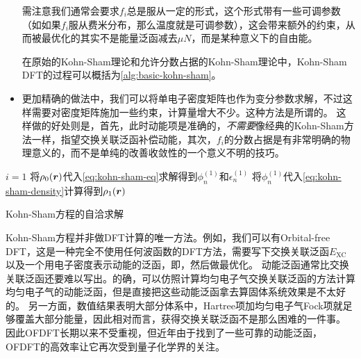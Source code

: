 \begin{itemize}
    需注意我们通常会要求$f_i$总是服从一定的形式，这个形式带有一些可调参数（如如果$f_i$服从费米分布，那么温度就是可调参数），这会带来额外的约束，从而被最优化的其实不是能量泛函减去$\mu N$，而是某种意义下的自由能。

    在原始的Kohn-Sham理论和允许分数占据的Kohn-Sham理论中，Kohn-Sham DFT的过程可以概括为\autoref{alg:basic-kohn-sham}。
    \item 更加精确的做法中，我们可以将单电子密度矩阵也作为变分参数求解，不过这样需要对密度矩阵施加一些约束，计算量增大不少。这种方法是所谓的。
    这样做的好处则是，首先，此时动能项是准确的，\emph{不需要}像经典的Kohn-Sham方法一样，指望交换关联泛函补偿动能，其次，$f_i$的分数占据是有非常明确的物理意义的，而不是单纯的改善收敛性的一个意义不明的技巧。
\end{itemize}

\begin{algorithm}

    \DontPrintSemicolon
    \SetAlgoLined

    
    $i = 1$ \;
    将$\rho_0(\vb*{r})$代入\eqref{eq:kohn-sham-eq}求解得到$\phi_n^{(1)}$和$\epsilon_n^{(1)}$ \;
    将$\phi_n^{(1)}$代入\eqref{eq:kohn-sham-density}计算得到$\rho_1(\vb*{r})$ \;
    
    \;

    \caption{Kohn-Sham方程的自洽求解}
    \label{alg:basic-kohn-sham}
\end{algorithm}

Kohn-Sham方程并非做DFT计算的唯一方法。例如，我们可以有Orbital-free DFT，这是一种完全不使用任何波函数的DFT方法，需要写下交换关联泛函$E_\text{XC}$以及一个用电子密度表示动能的泛函，即，然后做最优化。
动能泛函通常比交换关联泛函还要难以写出。的确，可以仿照计算均匀电子气交换关联泛函的方法计算均匀电子气的动能泛函，但是直接把这些动能泛函拿去算固体系统效果是不太好的。
另一方面，数值结果表明大部分体系中，Hartree项加均匀电子气Fock项就足够覆盖大部分能量，因此相对而言，获得交换关联泛函不是那么困难的一件事。
因此OFDFT长期以来不受重视，但近年由于找到了一些可靠的动能泛函，OFDFT的高效率让它再次受到量子化学界的关注。

